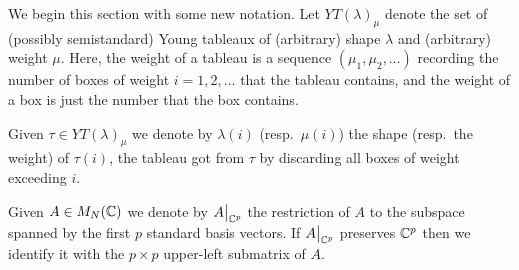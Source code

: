 \documentclass[draft]{article}
\begin{document}
We begin this section with some new notation. Let $YT(\lambda)_\mu$ denote the set of (possibly semistandard) Young tableaux of (arbitrary) shape $\lambda$ and (arbitrary) weight $\mu$. Here, the weight of a tableau is a sequence $(\mu_1,\mu_2,\dots)$ recording the number of boxes of weight $i = 1,2,\dots$ that the tableau contains, and the weight of a box is just the number that the box contains.

Given $\tau\in YT(\lambda)_\mu$ we denote by $\lambda(i)$ (resp.\ $\mu(i)$) the shape (resp.\ the weight) of $\tau(i)$, the tableau got from $\tau$ by discarding all boxes of weight exceeding $i$. 

Given $A \in M_N(\mathbb C)$ we denote by 
$A\big|_{\mathbb C^p}$ 
the restriction of $A$ to the subspace spanned by the first $p$ standard basis vectors. If $A\big|_{\mathbb C^p}$ preserves $\mathbb C^p$ then we identify it with the $p\times p$ upper-left submatrix of $A$. 
\end{document}
